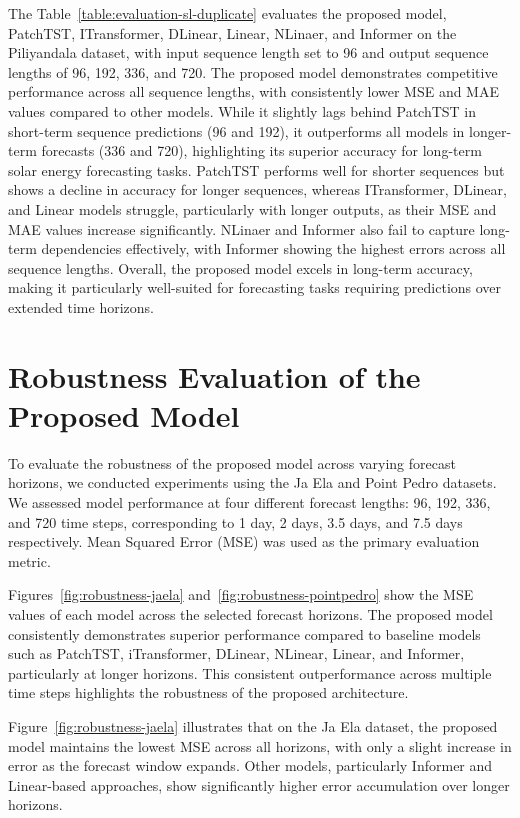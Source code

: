 \documentclass[12pt]{uomthesis}
\begin{document}
The Table~\ref{table:evaluation-sl-duplicate} evaluates the proposed model, PatchTST, ITransformer, DLinear, Linear, NLinaer, and Informer on the Piliyandala dataset, with input sequence length set to 96 and output sequence lengths of 96, 192, 336, and 720. The proposed model demonstrates competitive performance across all sequence lengths, with consistently lower MSE and MAE values compared to other models. While it slightly lags behind PatchTST in short-term sequence predictions (96 and 192), it outperforms all models in longer-term forecasts (336 and 720), highlighting its superior accuracy for long-term solar energy forecasting tasks. PatchTST performs well for shorter sequences but shows a decline in accuracy for longer sequences, whereas ITransformer, DLinear, and Linear models struggle, particularly with longer outputs, as their MSE and MAE values increase significantly. NLinaer and Informer also fail to capture long-term dependencies effectively, with Informer showing the highest errors across all sequence lengths. Overall, the proposed model excels in long-term accuracy, making it particularly well-suited for forecasting tasks requiring predictions over extended time horizons.

\section{Robustness Evaluation of the Proposed Model}


To evaluate the robustness of the proposed model across varying forecast horizons, we conducted experiments using the Ja Ela and Point Pedro datasets. We assessed model performance at four different forecast lengths: 96, 192, 336, and 720 time steps, corresponding to 1 day, 2 days, 3.5 days, and 7.5 days respectively. Mean Squared Error (MSE) was used as the primary evaluation metric.

Figures~\ref{fig:robustness-jaela} and~\ref{fig:robustness-pointpedro} show the MSE values of each model across the selected forecast horizons. The proposed model consistently demonstrates superior performance compared to baseline models such as PatchTST, iTransformer, DLinear, NLinear, Linear, and Informer, particularly at longer horizons. This consistent outperformance across multiple time steps highlights the robustness of the proposed architecture.

Figure~\ref{fig:robustness-jaela} illustrates that on the Ja Ela dataset, the proposed model maintains the lowest MSE across all horizons, with only a slight increase in error as the forecast window expands. Other models, particularly Informer and Linear-based approaches, show significantly higher error accumulation over longer horizons.
\end{document}
